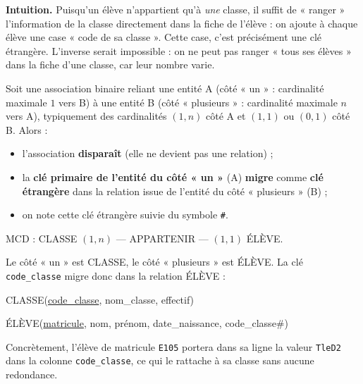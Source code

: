 \documentclass[11pt]{article}
\newcommand{\cle}[1]{{\popxbold\color{popdark}#1}}
\begin{document}
\textbf{Intuition.} Puisqu'un élève n'appartient qu'à \emph{une} classe, il suffit de « ranger » l'information de la classe directement dans la fiche de l'élève : on ajoute à chaque élève une case « code de sa classe ». Cette case, c'est précisément une \cle{clé étrangère}. L'inverse serait impossible : on ne peut pas ranger « tous ses élèves » dans la fiche d'une classe, car leur nombre varie.

\begin{propriete}
Soit une association binaire reliant une entité A (côté « un » : cardinalité maximale $1$ vers B) à une entité B (côté « plusieurs » : cardinalité maximale $n$ vers A), typiquement des cardinalités $(1,n)$ côté A et $(1,1)$ ou $(0,1)$ côté B. Alors :
\begin{itemize}
  \item l'association \textbf{disparaît} (elle ne devient pas une relation) ;
  \item la \textbf{clé primaire de l'entité du côté « un »} (A) \textbf{migre} comme \textbf{clé étrangère} dans la relation issue de l'entité du côté « plusieurs » (B) ;
  \item on note cette clé étrangère suivie du symbole \texttt{\#}.
\end{itemize}
\end{propriete}

\begin{exemplebox}
MCD : CLASSE $(1,n)$ — APPARTENIR — $(1,1)$ ÉLÈVE.

Le côté « un » est CLASSE, le côté « plusieurs » est ÉLÈVE. La clé \texttt{code\_classe} migre donc dans la relation ÉLÈVE :

CLASSE(\underline{code\_classe}, nom\_classe, effectif)

ÉLÈVE(\underline{matricule}, nom, prénom, date\_naissance, code\_classe\#)

Concrètement, l'élève de matricule \texttt{E105} portera dans sa ligne la valeur \texttt{TleD2} dans la colonne \texttt{code\_classe}, ce qui le rattache à sa classe sans aucune redondance.
\end{exemplebox}
\end{document}
